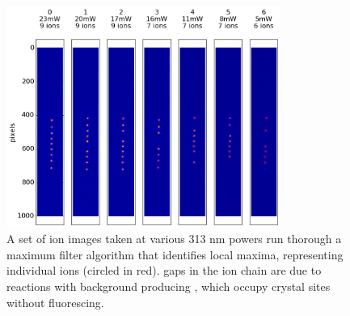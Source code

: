 \begin{figure}
	\centering
	\includegraphics[width=0.8\textwidth]{images/ion_images.png}
	\caption{A set of ion images taken at various 313 nm powers run thorough a maximum filter algorithm that identifies local maxima, representing individual ions (circled in red). gaps in the ion chain are due to reactions with background  producing , which occupy crystal sites without fluorescing.}
	\label{fig: ion image set}
\end{figure}

